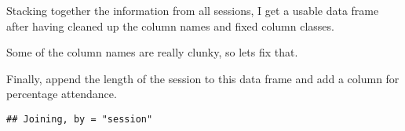 \documentclass[11pt,]{article}
\newenvironment{Shaded}{\begin{snugshade}}{\end{snugshade}}
\newcommand{\KeywordTok}[1]{\textcolor[rgb]{0.13,0.29,0.53}{\textbf{#1}}}
\newcommand{\DataTypeTok}[1]{\textcolor[rgb]{0.13,0.29,0.53}{#1}}
\newcommand{\DecValTok}[1]{\textcolor[rgb]{0.00,0.00,0.81}{#1}}
\newcommand{\StringTok}[1]{\textcolor[rgb]{0.31,0.60,0.02}{#1}}
\newcommand{\OperatorTok}[1]{\textcolor[rgb]{0.81,0.36,0.00}{\textbf{#1}}}
\newcommand{\NormalTok}[1]{#1}
\begin{document}
Stacking together the information from all sessions, I get a usable data
frame after having cleaned up the column names and fixed column classes.

\begin{Shaded}
\end{Shaded}

Some of the column names are really clunky, so lets fix that.

\begin{Shaded}
\end{Shaded}

Finally, append the length of the session to this data frame and add a
column for percentage attendance.

\begin{Shaded}
\end{Shaded}

\begin{verbatim}
## Joining, by = "session"
\end{verbatim}

\begin{Shaded}
\end{Shaded}
\end{document}
